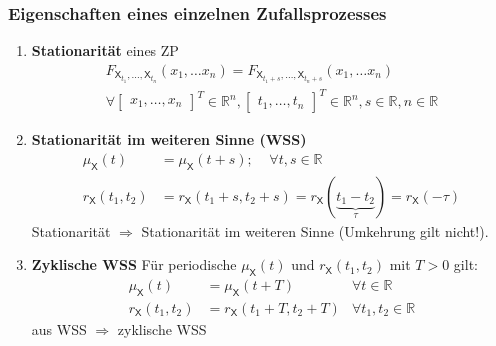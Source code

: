 \documentclass[a4paper,twocolumn,10pt]{article}
\newenvironment{iii}{\begin{enumerate}[label={\roman{*})}]}{\end{enumerate}}
\begin{document}
\subsubsection*{Eigenschaften eines einzelnen Zufallsprozesses} 
\begin{iii}
\item \textbf{Stationarität} eines ZP
\begin{align} F_{\mathsf{X}_{t_{1}},\dots,\mathsf{X}_{t_{n}}} (x_{1}, \dots x_{n}) = F_{\mathsf{X}_{t_{1}+s},\dots,\mathsf{X}_{t_{n}+s}} (x_{1}, \dots x_{n})  \nonumber \\
 \forall \begin{bmatrix}x_{1}, \dots, x_{n} \end{bmatrix}^{T} \in \mathbb{R}^{n}, \begin{bmatrix}t_{1}, \dots, t_{n} \end{bmatrix}^{T} \in \mathbb{R}^{n}, s \in \mathbb{R}, n \in \mathbb{R}  \nonumber
\end{align}
\item \textbf{Stationarität im weiteren Sinne (WSS)}
\begin{align}
  \mu_{\mathsf{X}}(t) &= \mu_{\mathsf{X}}(t+s);\;\;\;\; \forall t,s \in \mathbb{R} \nonumber \\
  r_{\mathsf{X}}(t_1,t_2) &= r_{\mathsf{X}}(t_1 + s, t_2 + s)=r_{\mathsf{X}}(\underbrace{t_1-t_2}_{\tau})=r_{\mathsf{X}}(-\tau) \nonumber
\end{align}
Stationarität $\Rightarrow$ Stationarität im weiteren Sinne (Umkehrung gilt nicht!).
\item \textbf{Zyklische WSS}
Für periodische $ \mu_{\mathsf{X}}(t)$ und $ r_{\mathsf{X}}(t_1,t_2)$ mit $T > 0$ gilt:
\begin{align}
  \mu_{\mathsf{X}}(t) &= \mu_{\mathsf{X}}(t+T) & \forall t \in \mathbb{R} \nonumber \\
  r_{\mathsf{X}}(t_1,t_2) &= r_{\mathsf{X}}(t_1 + T, t_2 + T) & \forall t_1,t_2 \in \mathbb{R} \nonumber
\end{align}
aus WSS $\Rightarrow$ zyklische WSS
\end{iii}
\end{document}

